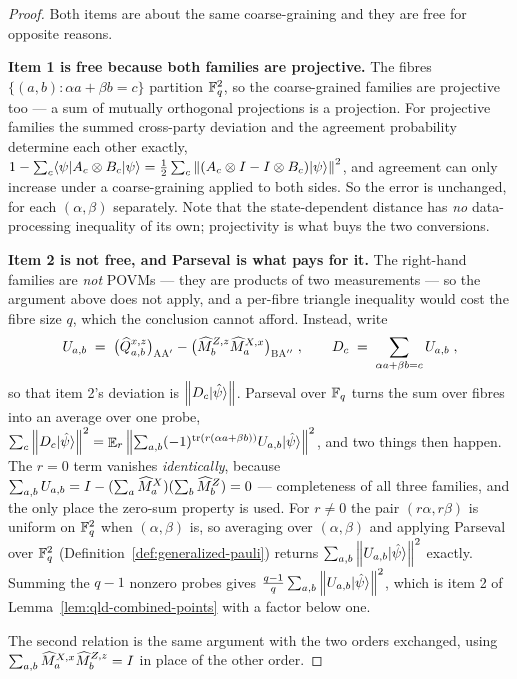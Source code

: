 \begin{proof}
\leanok
{}
Both items are about the same coarse-graining and they are free for opposite reasons.

\textbf{Item 1 is free because both families are projective.} The fibres
$\{(a, b) : \alpha a + \beta b = c\}$ partition $\mathbb{F}_q^2$, so the coarse-grained families are
projective too --- a sum of mutually orthogonal projections is a projection. For projective
families the summed cross-party deviation and the agreement probability determine each other
exactly, $1 - \sum_c \langle\psi| A_c \otimes B_c |\psi\rangle = \tfrac12 \sum_c \left\| {(A_c \otimes I -
I \otimes B_c)|\psi\rangle} \right\|^2$, and agreement can only increase under a coarse-graining applied to
both sides. So the error is unchanged, for each $(\alpha, \beta)$ separately. Note that the
state-dependent distance has \emph{no} data-processing inequality of its own; projectivity is
what buys the two conversions.

\textbf{Item 2 is not free, and Parseval is what pays for it.} The right-hand families are
\emph{not} POVMs --- they are products of two measurements --- so the argument above does not
apply, and a per-fibre triangle inequality would cost the fibre size $q$, which the conclusion
cannot afford. Instead, write
\begin{equation*}
  U_{a, b} \;=\; \bigl(\widehat{Q}^{x,z}_{a,b}\bigr)_{\textsc{A}\textsc{A}'}
    - \bigl(\widehat{M}^{Z, z}_b \widehat{M}^{X, x}_a\bigr)_{\textsc{B}\textsc{A}''}\;,
  \qquad
  D_c \;=\; \sum_{\alpha a + \beta b = c} U_{a, b}\;,
\end{equation*}
so that item 2's deviation is $\left\| {D_c |\hat\psi\rangle} \right\|$. Parseval over $\mathbb{F}_q$ turns the sum
over fibres into an average over one probe,
$\sum_c \left\| {D_c|\hat\psi\rangle} \right\|^2 = \mathop{\mathbb{E}}_r \left\| {\sum_{a,b} (-1)^{\operatorname{tr}(r(\alpha a + \beta
b))} U_{a,b} |\hat\psi\rangle} \right\|^2$, and two things then happen. The $r = 0$ term vanishes
\emph{identically}, because $\sum_{a,b} U_{a,b} = I - (\sum_a \widehat{M}^X_a)(\sum_b
\widehat{M}^Z_b) = 0$ --- completeness of all three families, and the only place the zero-sum
property is used. For $r \neq 0$ the pair $(r\alpha, r\beta)$ is uniform on $\mathbb{F}_q^2$ when
$(\alpha, \beta)$ is, so averaging over $(\alpha, \beta)$ and applying Parseval over $\mathbb{F}_q^2$
(Definition~\ref{def:generalized-pauli}) returns $\sum_{a,b}
\left\| {U_{a,b}|\hat\psi\rangle} \right\|^2$ exactly. Summing the $q - 1$ nonzero probes gives
$\tfrac{q-1}{q} \sum_{a,b} \left\| {U_{a,b}|\hat\psi\rangle} \right\|^2$, which is item 2 of
Lemma~\ref{lem:qld-combined-points} with a factor below one.

The second relation is the same argument with the two orders exchanged, using
$\sum_{a,b} \widehat{M}^{X, x}_a \widehat{M}^{Z, z}_b = I$ in place of the other order.
\end{proof}

